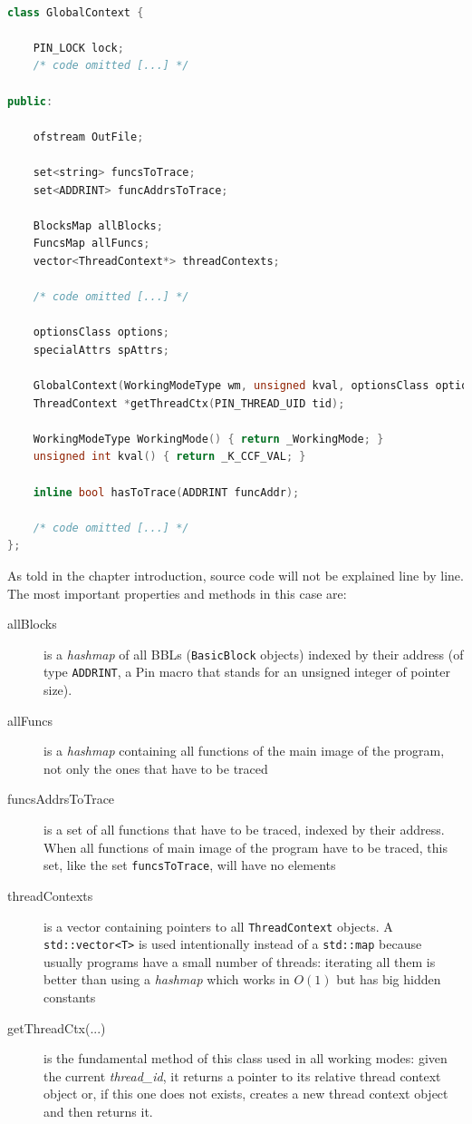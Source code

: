 \documentclass[a4paper,10pt]{report}
\begin{document}
\begin{lstlisting}[language=C++, 
	caption={partial definition of \texttt{GlobalContext}}, label=globalCtx, frame=leftline]

class GlobalContext {
	
	PIN_LOCK lock;
	/* code omitted [...] */

public:

	ofstream OutFile;

	set<string> funcsToTrace;
	set<ADDRINT> funcAddrsToTrace;

	BlocksMap allBlocks;
	FuncsMap allFuncs;
	vector<ThreadContext*> threadContexts;

	/* code omitted [...] */

	optionsClass options;
	specialAttrs spAttrs;

	GlobalContext(WorkingModeType wm, unsigned kval, optionsClass options);
	ThreadContext *getThreadCtx(PIN_THREAD_UID tid);

	WorkingModeType WorkingMode() { return _WorkingMode; }
	unsigned int kval() { return _K_CCF_VAL; }

	inline bool hasToTrace(ADDRINT funcAddr);

	/* code omitted [...] */
};

\end{lstlisting}

\noindent
As told in the chapter introduction, source code will not be explained line by line.
The most important properties and methods in this case are:
\begin{description}
\item[allBlocks] is a \emph{hashmap} of all BBLs (\verb|BasicBlock| objects) indexed by their address (of type \verb|ADDRINT|, a Pin macro that stands for an unsigned integer
of pointer size).
\item[allFuncs] is a \emph{hashmap} containing all functions of the main image of the
program, not only the ones that have to be traced
\item[funcsAddrsToTrace] is a set of all functions that have to be traced, indexed 
by their address. When all functions of main image of the program have to be traced,
this set, like the set \verb|funcsToTrace|, will have no elements
\item[threadContexts] is a vector containing pointers to all \verb|ThreadContext| objects. A \verb|std::vector<T>| is used intentionally instead of a \verb|std::map| because
usually programs have a small number of threads: iterating all them is better than using a \emph{hashmap} which works in $O(1)$ but has big hidden constants
\item[getThreadCtx(...)] is the fundamental method of this class used in all working modes:
given the current \emph{thread\_id}, it returns a pointer to its relative thread context object or, if this one does not exists, creates a new thread context object and then returns it.
\end{description}
\end{document}
